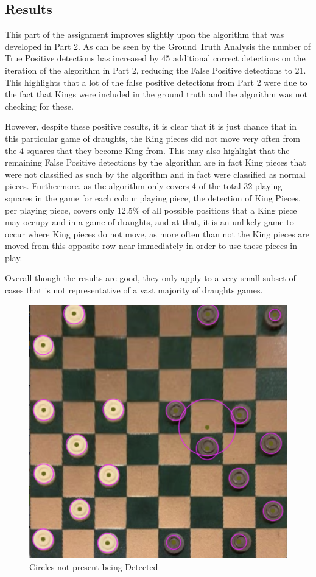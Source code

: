 \documentclass[11pt]{article}
\begin{document}
    \subsection{Results}
    \par
    This part of the assignment improves slightly upon the algorithm that was developed in Part 2. As can be seen by the Ground Truth Analysis the number of True Positive detections has increased by 45 additional correct detections on the iteration of the algorithm in Part 2, reducing the False Positive detections to 21. This highlights that a lot of the false positive detections from
    Part 2 were due to the fact that Kings were included in the ground truth and the algorithm was not checking for these. 
    \par
    However, despite these positive results, it is clear that it is just chance that in this particular game of draughts, the King pieces did not move very often from the 4 squares that they become King from. This may also highlight that the remaining False Positive detections by the algorithm are in fact King pieces that were not classified as such by the algorithm and in fact were
    classified as normal pieces. Furthermore, as the algorithm only covers 4 of the total 32 playing squares in the game for each colour playing piece, the detection of King Pieces, per playing piece, covers only 12.5\% of all possible positions that a King piece may occupy and in a game of draughts, and at that, it is an unlikely game to occur where King pieces do not move, as more often than not the King pieces are
    moved from this opposite row near immediately in order to use these pieces in play.
    \par 
    Overall though the results are good, they only apply to a very small subset of cases that is not representative of a vast majority of draughts games.
    
    \newpage
    \begin{figure}
        \centering
        \includegraphics[scale=0.2]{HoughCirclesFail.png}
        \caption{Circles not present being Detected}
    \end{figure}
\end{document}
